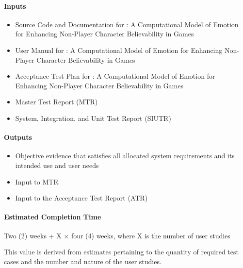 \paragraph{Inputs}
\begin{itemize}

    \item Source Code and Documentation for \progname{}: A Computational Model
    of Emotion for Enhancing Non-Player Character Believability in Games

    \item User Manual for \progname{}: A Computational Model
    of Emotion for Enhancing Non-Player Character Believability in Games

    \item Acceptance Test Plan for \progname{}: A Computational Model of
    Emotion for Enhancing Non-Player Character Believability in Games

    \item Master Test Report (MTR)

    \item System, Integration, and Unit Test Report (SIUTR)

\end{itemize}

\paragraph{Outputs}
\begin{itemize}

    \item Objective evidence that \progname{} satisfies all allocated system
    requirements and its intended use and user needs

    \item Input to MTR

    \item Input to the Acceptance Test Report (ATR)

\end{itemize}

\paragraph{Estimated Completion Time} Two (2) weeks + X $\times$ four (4)
weeks, where X is the number of user studies

This value is derived from estimates pertaining to the quantity of required
test cases and the number and nature of the user studies.

